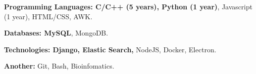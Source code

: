 

\begin{cvitems} %
  \item {\textbf{Programming Languages: C/C++ (5 years), Python (1 year)}, Javascript (1 year), HTML/CSS, AWK.}
  \item {\textbf{Databases: MySQL}, MongoDB.}
  \item {\textbf{Technologies: Django, Elastic Search,} NodeJS, Docker, Electron.}
  \item {\textbf{Another:} Git, Bash, Bioinfomatics.}
\end{cvitems}

